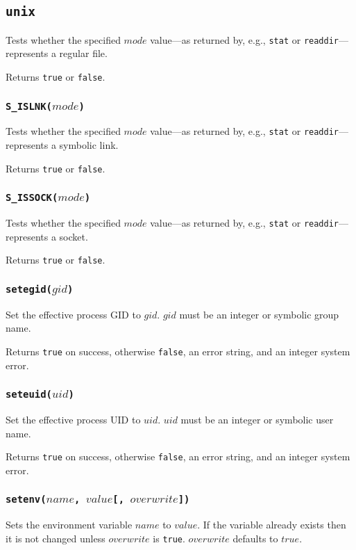 \documentclass[11pt, oneside]{memoir}
\newcommand*{\true}[0]{\texttt{true}\xspace}
\newcommand*{\false}[0]{\texttt{false}\xspace}
\newcommand*{\syscall}[1]{\texttt{#1}\xspace}
\newcommand*{\fn}[1]{\texttt{#1}\xspace}
\newcounter{toccols}
\newenvironment{Module}[1]{
	\subsection{\texttt{#1}}
	\addtocontents{toc}{
		\protect\begin{multicols}{\value{toccols}}
	}
}{
	\addtocontents{toc}{\protect\end{multicols}}
}
\begin{document}
\begin{Module}{unix}
Tests whether the specified $mode$ value---as returned by, e.g., \syscall{stat} or \syscall{readdir}---represents a regular file.

Returns \true or \false.

\subsubsection[\fn{S\_ISLNK}]{\fn{S\_ISLNK($mode$)}}

Tests whether the specified $mode$ value---as returned by, e.g., \syscall{stat} or \syscall{readdir}---represents a symbolic link.

Returns \true or \false.

\subsubsection[\fn{S\_ISSOCK}]{\fn{S\_ISSOCK($mode$)}}

Tests whether the specified $mode$ value---as returned by, e.g., \syscall{stat} or \syscall{readdir}---represents a socket.

Returns \true or \false.

\subsubsection[\fn{setegid}]{\fn{setegid($gid$)}}

Set the effective process GID to $gid$. $gid$ must be an integer or symbolic group name.

Returns \true on success, otherwise \false, an error string, and an integer system error.

\subsubsection[\fn{seteuid}]{\fn{seteuid($uid$)}}

Set the effective process UID to $uid$. $uid$ must be an integer or symbolic user name.

Returns \true on success, otherwise \false, an error string, and an integer system error.

\subsubsection[\fn{setenv}]{\fn{setenv($name$, $value$[, $overwrite$])}}

Sets the environment variable $name$ to $value$. If the variable already exists then it is not changed unless $overwrite$ is \true. $overwrite$ defaults to $true$.


\end{Module}
\end{document}
